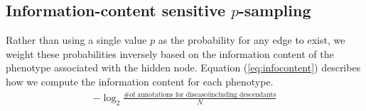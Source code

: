 \subsection{Information-content sensitive $p$-sampling}
Rather than using a single value $p$ as the probability for any edge to exist, we weight these
probabilities inversely based on the information content of the phenotype associated with the hidden node. 
Equation (\ref{eq:infocontent}) describes how we compute the information content for each phenotype.
\begin{align}\label{eq:infocontent}
	-\log_{2}\frac{\text{\# of annotations for disease} i \text{including descendants}}{N}
\end{align}


